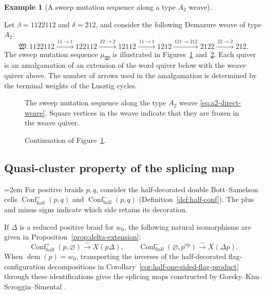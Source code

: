 \documentclass[10pt,a4paper]{article}
\theoremstyle{definition}
\newtheorem{example}[theorem]{Example}
\theoremstyle{remark}
\newcommand{\Confhalf}{\operatorname{Conf}_{\mathrm{half}}}
\newcommand{\fW}{\mathfrak W}
\begin{document}
\begin{example}[A sweep mutation sequence along a type \(A_2\) weave]
\label{subsec:a2-mutation-term-example}

Let \(\beta=1122112\) and \(\delta=212\), and
consider the following Demazure weave of type \(A_2\):
\begin{equation}
 \fW:
 1122112\xrightarrow{\,11\to1\,}122112
 \xrightarrow{\,22\to2\,}12112
 \xrightarrow{\,11\to1\,}1212
 \xrightarrow{\,121\to212\,}2122
 \xrightarrow{\,22\to2\,}212.
 \label{eq:a2-direct-weave}
\end{equation}
The sweep mutation sequence \(\mu_\fW\) is illustrated in
Figures~\ref{fig:a2-five-step-mutation-early}
and~\ref{fig:a2-five-step-mutation-late}.  
Each quiver is an amalgamation of an extension of the word quiver below with
the weave quiver above.  The number of arrows used in the amalgamation is
determined by the terminal weights of the Lusztig cycles.
\end{example}

\begin{figure}[p]
\centering

\caption{The sweep mutation sequence along the type \(A_2\) weave
\eqref{eq:a2-direct-weave}.  Square vertices in the weave indicate that they
are frozen in the weave quiver.}
\label{fig:a2-five-step-mutation-early}
\end{figure}

\begin{figure}[p]
\centering

\caption{Continuation of Figure~\ref{fig:a2-five-step-mutation-early}.}
\label{fig:a2-five-step-mutation-late}
\end{figure}

\subsection{Quasi-cluster property of the splicing map}

\begingroup
\emergencystretch=2em
For positive braids \(p,q\), consider the half-decorated double
Bott--Samelson cells \(\Confhalf^+(p,q)\) and \(\Confhalf^-(p,q)\)
(Definition~\ref{def:half-conf}).  The plus and minus signs indicate which side
retains its decoration.
\par
\endgroup
If \(\Delta\) is a reduced positive braid for \(w_0\), the following natural
isomorphisms are given in Proposition~\ref{prop:delta-extension}:
\[
 \Confhalf^+ (p,\varnothing)\xrightarrow{\sim}X(p \Delta),
 \qquad
 \Confhalf^- (\varnothing,p^{\mathrm{op}})
 \xrightarrow{\sim}X(\Delta p).
\]
When \(\operatorname{dem}(p)=w_0\), transporting the inverses of the
half-decorated flag-configuration decompositions in
Corollary~\ref{cor:half-one-sided-flag-product}
through these identifications gives the splicing maps constructed by
Gorsky--\allowbreak Kim--\allowbreak Scroggin--\allowbreak Simental
\cite[Theorem~1.1]{GorskyKimScrogginSimental2025}.
\end{document}
